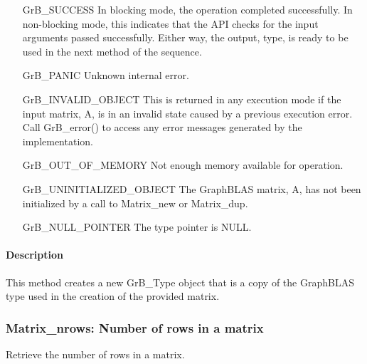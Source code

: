 \begin{itemize}[leftmargin=2.1in]
    \item[{\sf GrB\_SUCCESS}]         In blocking mode, the operation completed
    successfully. In non-blocking mode, this indicates that the API checks 
    for the input arguments passed successfully. Either way, the output,
    {\sf type}, is ready to be used in the next method of the sequence.

    \item[{\sf GrB\_PANIC}]           Unknown internal error.
    
    \item[{\sf GrB\_INVALID\_OBJECT}] This is returned in any execution mode 
    if the input matrix, {\sf A}, is in an invalid 
    state caused by a previous execution error.  Call {\sf GrB\_error()} to access 
    any error messages generated by the implementation.

    \item[{\sf GrB\_OUT\_OF\_MEMORY}] Not enough memory available for operation.
    
    \item[{\sf GrB\_UNINITIALIZED\_OBJECT}]  The GraphBLAS matrix, {\sf A}, has 
    not been initialized by a call to {\sf Matrix\_new} or {\sf Matrix\_dup}.
    
    \item[{\sf GrB\_NULL\_POINTER}]  The {\sf type} pointer is {\sf NULL}.
\end{itemize}

\paragraph{Description}

This method creates a new {\sf GrB\_Type} object that is a copy of the GraphBLAS
type used in the creation of the provided matrix.

\subsubsection{{\sf Matrix\_nrows}: Number of rows in a matrix}

Retrieve the number of rows in a matrix.

\paragraph{\syntax}

